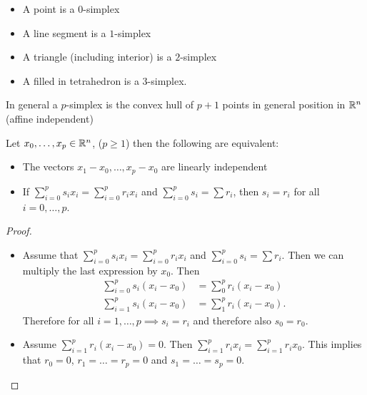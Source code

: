 \begin{itemize}
    \item A  point is a $0$-simplex
    \item A line segment is a $1$-simplex
    \item A triangle (including interior) is a $2$-simplex
    \item A filled in tetrahedron is a $3$-simplex.
\end{itemize}
\begin{definition}[Simplex]
    In general a $p$-simplex is the convex hull of $p + 1$ points in general position in $\mathbb{R}^n$ (affine independent)
\end{definition}
\begin{prop}[1.1]
    Let $x_0, \ldots, x_p \in \mathbb{R}^{n}$, ($p \ge  1$) then the following are equivalent:
    \begin{itemize}
        \item The vectors $x_1 - x_0, \ldots, x_p - x_0$ are linearly independent
        \item If $\sum_{i=0}^{p} s_i x_i = \sum_{i=0}^{p} r_i x_i$ and $\sum_{i=0}^{p} s_i = \sum r_i$, then $s_i = r_i $ for all $i=0, \ldots, p$.
    \end{itemize}
\end{prop}
\begin{proof}
    \begin{itemize}
        \item Assume that $\sum_{i=0}^{p} s_i x_i = \sum_{i=0}^{p} r_i x_i$ and  $\sum_{i=0}^{p} s_i = \sum r_i$. Then we can multiply the last expression by $x_0$.
            Then
            \begin{align*}
                \sum_{i=0}^{p} s_i (x_i - x_0) &= \sum_{0}^{p} r_i (x_i - x_0)\\
                \sum_{i=1}^{p} s_i (x_i - x_0) &= \sum_{1}^{p} r_i (x_i - x_0)
            .\end{align*}
            Therefore for all $i = 1, \ldots, p \implies s_i = r_i$ and therefore also $s_0 = r_0$.

        \item Assume $\sum_{i=1}^{p} r_i (x_i - x_0) = 0$.
            Then $\sum_{i=1}^{p} r_i x_i = \sum_{i=1}^{p} r_i x_0$.
            This implies that $r_0 = 0$, $r_1 = \ldots = r_p = 0$ and $s_1 = \ldots = s_p = 0$.
    \end{itemize}
\end{proof}


\hr

